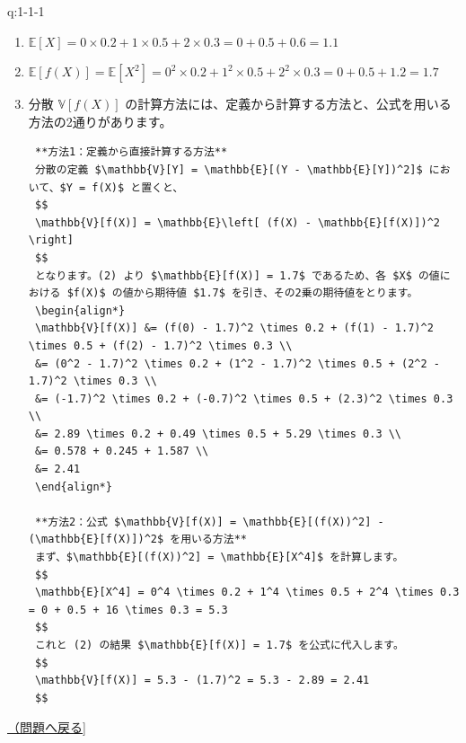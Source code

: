 \begin{answerbox}[phantomlabel=a:1-1-1]{q:1-1-1}

\begin{enumerate}
\def\labelenumi{\arabic{enumi}.}
\item
  \(\mathbb{E}[X] = 0 \times 0.2 + 1 \times 0.5 + 2 \times 0.3 = 0 + 0.5 + 0.6 = 1.1\)
\item
  \(\mathbb{E}[f(X)] = \mathbb{E}[X^2] = 0^2 \times 0.2 + 1^2 \times 0.5 + 2^2 \times 0.3 = 0 + 0.5 + 1.2 = 1.7\)
\item
  分散 \(\mathbb{V}[f(X)]\)
  の計算方法には、定義から計算する方法と、公式を用いる方法の2通りがあります。

\begin{verbatim}
 **方法1：定義から直接計算する方法**
 分散の定義 $\mathbb{V}[Y] = \mathbb{E}[(Y - \mathbb{E}[Y])^2]$ において、$Y = f(X)$ と置くと、
 $$
 \mathbb{V}[f(X)] = \mathbb{E}\left[ (f(X) - \mathbb{E}[f(X)])^2 \right]
 $$
 となります。(2) より $\mathbb{E}[f(X)] = 1.7$ であるため、各 $X$ の値における $f(X)$ の値から期待値 $1.7$ を引き、その2乗の期待値をとります。
 \begin{align*}
 \mathbb{V}[f(X)] &= (f(0) - 1.7)^2 \times 0.2 + (f(1) - 1.7)^2 \times 0.5 + (f(2) - 1.7)^2 \times 0.3 \\
 &= (0^2 - 1.7)^2 \times 0.2 + (1^2 - 1.7)^2 \times 0.5 + (2^2 - 1.7)^2 \times 0.3 \\
 &= (-1.7)^2 \times 0.2 + (-0.7)^2 \times 0.5 + (2.3)^2 \times 0.3 \\
 &= 2.89 \times 0.2 + 0.49 \times 0.5 + 5.29 \times 0.3 \\
 &= 0.578 + 0.245 + 1.587 \\
 &= 2.41
 \end{align*}

 **方法2：公式 $\mathbb{V}[f(X)] = \mathbb{E}[(f(X))^2] - (\mathbb{E}[f(X)])^2$ を用いる方法**
 まず、$\mathbb{E}[(f(X))^2] = \mathbb{E}[X^4]$ を計算します。
 $$
 \mathbb{E}[X^4] = 0^4 \times 0.2 + 1^4 \times 0.5 + 2^4 \times 0.3 = 0 + 0.5 + 16 \times 0.3 = 5.3
 $$
 これと (2) の結果 $\mathbb{E}[f(X)] = 1.7$ を公式に代入します。
 $$
 \mathbb{V}[f(X)] = 5.3 - (1.7)^2 = 5.3 - 2.89 = 2.41
 $$
\end{verbatim}
\end{enumerate}

\hfill 

\hyperref[q:1-1-1]{（問題へ戻る{]}}

\end{answerbox}

